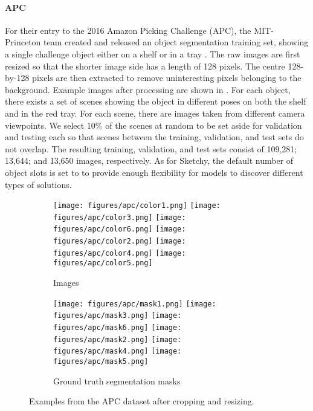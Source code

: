 \documentclass{article}
\begin{document}
\paragraph{APC}
For their entry to the 2016 Amazon Picking Challenge (APC), the MIT-Princeton team created and released an object segmentation training set, showing a single challenge object either on a shelf or in a tray \citep{zeng2016multi}.
The raw images are first resized so that the shorter image side has a length of 128 pixels.
The centre 128-by-128 pixels are then extracted to remove uninteresting pixels belonging to the background.
Example images after processing are shown in .
For each object, there exists a set of scenes showing the object in different poses on both the shelf and in the red tray.
For each scene, there are images taken from different camera viewpoints.
We select 10\% of the scenes at random to be set aside for validation and testing each so that scenes between the training, validation, and test sets do not overlap.
The resulting training, validation, and test sets consist of 109,281; 13,644; and 13,650 images, respectively.
As for Sketchy, the default number of object slots is set to  to provide enough flexibility for models to discover different types of solutions.
\begin{figure}[h!]
	\begin{subfigure}{\linewidth}
	    \centering
		\texttt{[image: figures/apc/color1.png]}
		\texttt{[image: figures/apc/color3.png]}
		\texttt{[image: figures/apc/color6.png]}
		\texttt{[image: figures/apc/color2.png]}
		\texttt{[image: figures/apc/color4.png]}
		\texttt{[image: figures/apc/color5.png]}
		\caption{Images}
		\vspace{6pt}
	\end{subfigure}
	\begin{subfigure}{\linewidth}
	    \centering
		\texttt{[image: figures/apc/mask1.png]}
		\texttt{[image: figures/apc/mask3.png]}
		\texttt{[image: figures/apc/mask6.png]}
		\texttt{[image: figures/apc/mask2.png]}
		\texttt{[image: figures/apc/mask4.png]}
		\texttt{[image: figures/apc/mask5.png]}
		\caption{Ground truth segmentation masks}
	\end{subfigure}
	\caption{Examples from the APC dataset \citep{zeng2016multi} after cropping and resizing.}
	\label{fig:gpp:apc:crop}
\end{figure}
\end{document}
